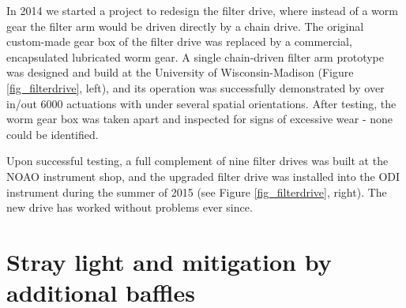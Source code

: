 \documentclass[]{spieman}
\begin{document}
In 2014 we  started a project to redesign the filter drive, where instead of a
worm gear the filter arm would be driven directly by a chain drive. The original
custom-made gear box of the filter drive was replaced by a commercial,
encapsulated lubricated worm gear. A single chain-driven filter arm prototype
was designed and build at the University of Wisconsin-Madison (Figure
\ref{fig_filterdrive}, left), and its operation was successfully demonstrated by
over in/out 6000 actuations with under several spatial orientations. After
testing, the worm gear box was taken apart and inspected for signs of excessive
wear - none  could be identified.

Upon successful testing, a full complement of nine filter drives was built at
the NOAO instrument shop, and the upgraded filter drive was installed into the
ODI instrument during the summer of 2015 (see Figure \ref{fig_filterdrive},
right). The new drive has worked without problems ever since.



\section{Stray light and mitigation by additional baffles}
\end{document}
